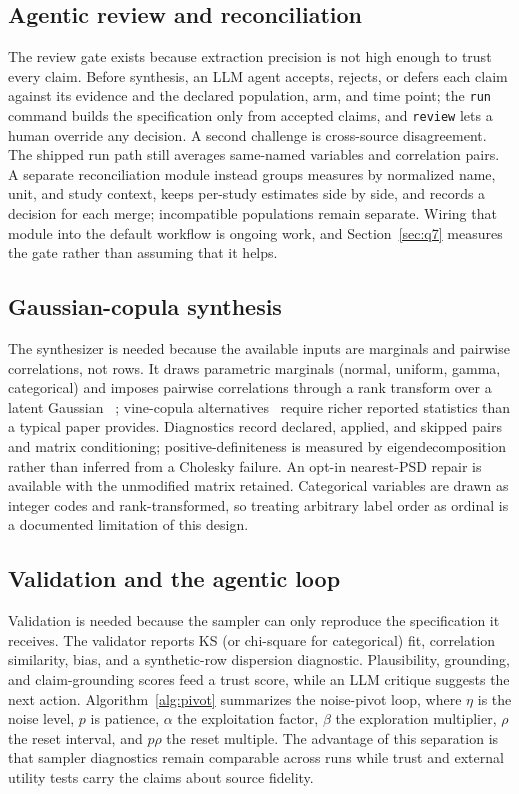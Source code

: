 \documentclass[letterpaper]{article}
\begin{document}
\subsection{Agentic review and reconciliation}
\label{sec:review}

The review gate exists because extraction precision is not high enough to trust every claim.
Before synthesis, an LLM agent accepts, rejects, or defers each claim against its evidence and the
declared population, arm, and time point; the \texttt{run} command builds the specification only
from accepted claims, and \texttt{review} lets a human override any decision. A second challenge
is cross-source disagreement. The shipped run path still averages same-named variables and
correlation pairs. A separate reconciliation module instead groups measures by normalized name,
unit, and study context, keeps per-study estimates side by side, and records a decision for each
merge; incompatible populations remain separate. Wiring that module into the default workflow is
ongoing work, and Section~\ref{sec:q7} measures the gate rather than assuming that it helps.

\subsection{Gaussian-copula synthesis}
\label{sec:synth}

The synthesizer is needed because the available inputs are marginals and pairwise correlations,
not rows. It draws parametric marginals (normal, uniform, gamma, categorical) and imposes
pairwise correlations through a rank transform over a latent Gaussian
~\citep{joe2014,trivedi2006}; vine-copula alternatives~\citep{aas2009} require richer reported
statistics than a typical paper provides. Diagnostics record declared, applied, and skipped pairs
and matrix conditioning; positive-definiteness is measured by eigendecomposition rather than
inferred from a Cholesky failure. An opt-in nearest-PSD repair is available with the unmodified
matrix retained. Categorical variables are drawn as integer codes and rank-transformed, so
treating arbitrary label order as ordinal is a documented limitation of this design.

\subsection{Validation and the agentic loop}
\label{sec:loop}

Validation is needed because the sampler can only reproduce the specification it receives. The
validator reports KS (or chi-square for categorical) fit, correlation similarity, bias, and a
synthetic-row dispersion diagnostic. Plausibility, grounding, and claim-grounding scores feed a
trust score, while an LLM critique suggests the next action. Algorithm~\ref{alg:pivot} summarizes
the noise-pivot loop, where $\eta$ is the noise level, $p$ is patience, $\alpha$ the exploitation
factor, $\beta$ the exploration multiplier, $\rho$ the reset interval, and $p\rho$ the reset
multiple. The advantage of this separation is that sampler diagnostics remain comparable across
runs while trust and external utility tests carry the claims about source fidelity.
\end{document}
